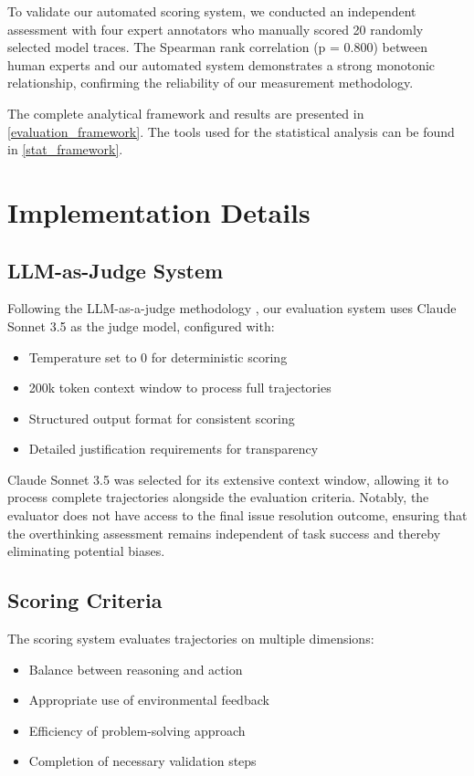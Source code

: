 To validate our automated scoring system, we conducted an independent assessment with four expert annotators who manually scored 20 randomly selected model traces. The Spearman rank correlation (p = 0.800) between human experts and our automated system demonstrates a strong monotonic relationship, confirming the reliability of our measurement methodology.

The complete analytical framework and results are presented in \cref{evaluation_framework}. The tools used for the statistical analysis can be found in \cref{stat_framework}.

\section{Implementation Details}
\label{sec:implementation}

\subsection{LLM-as-Judge System}
Following the LLM-as-a-judge methodology \cite{zheng2023judgingllmasajudgemtbenchchatbot}, our evaluation system uses Claude Sonnet 3.5 as the judge model, configured with:
\begin{itemize}
    \item Temperature set to 0 for deterministic scoring
    \item 200k token context window to process full trajectories
    \item Structured output format for consistent scoring
    \item Detailed justification requirements for transparency
\end{itemize}

Claude Sonnet 3.5 was selected for its extensive context window, allowing it to process complete trajectories alongside the evaluation criteria. Notably, the evaluator does not have access to the final issue resolution outcome, ensuring that the overthinking assessment remains independent of task success and thereby eliminating potential biases.

\subsection{Scoring Criteria}
The scoring system evaluates trajectories on multiple dimensions:
\begin{itemize}
    \item Balance between reasoning and action
    \item Appropriate use of environmental feedback
    \item Efficiency of problem-solving approach
    \item Completion of necessary validation steps
\end{itemize}

